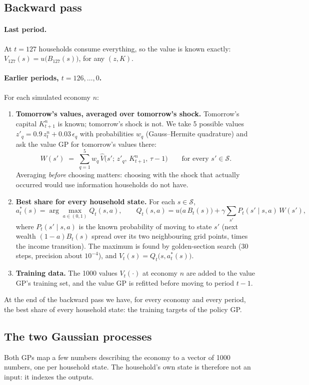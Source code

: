 \documentclass[11pt,a4paper]{article}
\begin{document}
\subsection{Backward pass}\label{sec:backward}
\paragraph{Last period.} At $t = 127$ households consume everything, so the value is known exactly:
$V_{127}(s) = u\big(B_{127}(s)\big)$, for any $(z, K)$.

\paragraph{Earlier periods, $t = 126, \ldots, 0$.} For each simulated economy $n$:
\begin{enumerate}
\item \textbf{Tomorrow's values, averaged over tomorrow's shock.} Tomorrow's capital $K_{t+1}^n$ is
  known; tomorrow's shock is not. We take 5 possible values $z'_q = 0.9\,z_t^n + 0.03\,\epsilon_q$
  with probabilities $w_q$ (Gauss--Hermite quadrature) and ask the value GP for tomorrow's values
  there:
  \[
  W(s') \;=\; \sum_{q=1}^{5} w_q\, \widehat V\big(s';\, z'_q,\, K_{t+1}^n,\, \tau-1\big)
  \qquad \text{for every } s' \in \mathcal S .
  \]
  Averaging \emph{before} choosing matters: choosing with the shock that actually occurred would use
  information households do not have.
\item \textbf{Best share for every household state.} For each $s \in \mathcal S$,
  \[
  a^*_t(s) = \arg\max_{a \in (0,1)} Q_t(s,a), \qquad
  Q_t(s,a) = u\big(a\,B_t(s)\big) + \gamma \sum_{s'} P_t(s' \mid s,a)\, W(s'),
  \]
  where $P_t(s'\mid s,a)$ is the known probability of moving to state $s'$ (next wealth
  $(1-a)B_t(s)$ spread over its two neighbouring grid points, times the income transition). The
  maximum is found by golden-section search (30 steps, precision about $10^{-4}$), and
  $V_t(s) = Q_t\big(s, a^*_t(s)\big)$.
\item \textbf{Training data.} The 1000 values $V_t(\cdot)$ at economy $n$ are added to the value GP's
  training set, and the value GP is refitted before moving to period $t-1$.
\end{enumerate}
At the end of the backward pass we have, for every economy and every period, the best share of every
household state: the training targets of the policy GP.

\subsection{The two Gaussian processes}
Both GPs map a few numbers describing the economy to a vector of 1000 numbers, one per household
state. The household's own state is therefore not an input: it indexes the outputs.
\end{document}
